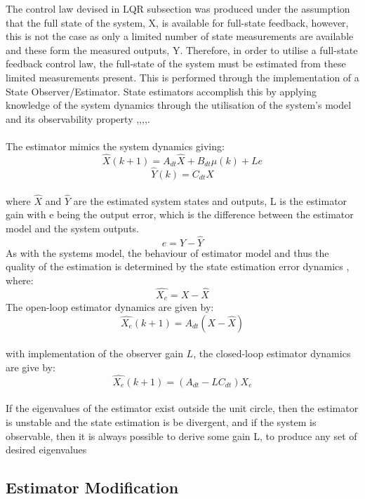 \documentclass[12pt,a4paper,twoside]{report}
\begin{document}
				The control law devised in LQR subsection was produced under the assumption that the full state of the system, X, is available for full-state feedback, however, this is not the case as only a limited number of state measurements are available and these form the measured outputs, Y. Therefore, in order to utilise a full-state feedback control law, the full-state of the system must be estimated from these limited measurements present. This is performed through the implementation of a State Observer/Estimator. State estimators accomplish this by applying knowledge of the system dynamics through the utilisation of the system's model and its observability property \cite{18},\cite{21},\cite{22},\cite{23},\cite{24}.
				\\ \\
				The estimator mimics the system dynamics giving: 
				\[
					\hat{X}(k+1) = A_{dt}\hat{X} + B_{dt} \mu(k) + L e
				\]
				\begin{equation}
					\hat{Y}(k) = C_{dt}\hat{X}
				\end{equation}
				\\
				where $\hat{X}$ and $\hat{Y}$ are the estimated system states and outputs, L is the estimator gain with e being the output error, which is the difference between the estimator model and the system outputs.
				\[
					e = Y - \hat{Y}
				\]
				As with the systems model, the behaviour of estimator model and thus the quality of the estimation is determined by the state estimation error dynamics \cite{18}, where:
				\[
					\hat{X_e} = X - \hat{X}
				\]
				The open-loop estimator dynamics are given by:
				\begin{equation}
					\hat{X_e}(k+1) = A_{dt}(X - \hat{X})
				\end{equation}
				\\
				with implementation of the observer gain $L$, the closed-loop estimator dynamics are give by:
				\begin{equation}
					\hat{X_e}(k+1) = (A_{dt} - L C_{dt})\hat{X_e}
				\end{equation}
				\\
				If the eigenvalues of the estimator exist outside the unit circle, then the estimator is unstable and the state estimation is be divergent, and if the system is observable, then it is always possible to derive some gain L, to produce any set of desired eigenvalues \cite{18} 
				\\
			\subsection{Estimator Modification}
			
\end{document}

